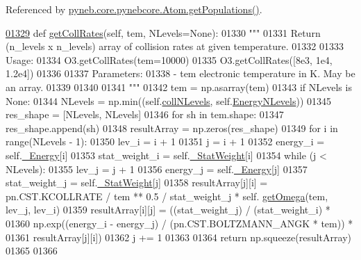 Referenced by \hyperlink{pynebcore_8py_source_l01496}{pyneb.\+core.\+pynebcore.\+Atom.\+get\+Populations()}.


\begin{DoxyCode}
\hypertarget{classpyneb_1_1core_1_1pynebcore_1_1_atom_l01329}{}\hyperlink{classpyneb_1_1core_1_1pynebcore_1_1_atom_a34711ea989baf7bde752a68255d32098}{01329}     \textcolor{keyword}{def }\hyperlink{classpyneb_1_1core_1_1pynebcore_1_1_atom_a34711ea989baf7bde752a68255d32098}{getCollRates}(self, tem, NLevels=None):
01330         \textcolor{stringliteral}{"""}
01331 \textcolor{stringliteral}{        Return (n\_levels x n\_levels) array of collision rates at given temperature. }
01332 \textcolor{stringliteral}{        }
01333 \textcolor{stringliteral}{        Usage:}
01334 \textcolor{stringliteral}{            O3.getCollRates(tem=10000)}
01335 \textcolor{stringliteral}{            O3.getCollRates([8e3, 1e4, 1.2e4])}
01336 \textcolor{stringliteral}{        }
01337 \textcolor{stringliteral}{        Parameters:}
01338 \textcolor{stringliteral}{            - tem     electronic temperature in K. May be an array.}
01339 \textcolor{stringliteral}{}
01340 \textcolor{stringliteral}{}
01341 \textcolor{stringliteral}{        """}
01342         tem = np.asarray(tem)
01343         \textcolor{keywordflow}{if} NLevels \textcolor{keywordflow}{is} \textcolor{keywordtype}{None}:
01344             NLevels = np.min((self.\hyperlink{classpyneb_1_1core_1_1pynebcore_1_1_atom_a8beaa0244d575054b3e2748a5e00d8db}{collNLevels}, self.\hyperlink{classpyneb_1_1core_1_1pynebcore_1_1_atom_a03277bf57e7056ec2199cc89f2a007aa}{EnergyNLevels}))
01345         res\_shape = [NLevels, NLevels]
01346         \textcolor{keywordflow}{for} sh \textcolor{keywordflow}{in} tem.shape:
01347             res\_shape.append(sh)
01348         resultArray = np.zeros(res\_shape)
01349         \textcolor{keywordflow}{for} i \textcolor{keywordflow}{in} range(NLevels - 1):
01350             lev\_i = i + 1
01351             j = i + 1
01352             energy\_i = self.\hyperlink{classpyneb_1_1core_1_1pynebcore_1_1_atom_a52e68715246d258bf0a14f4bd06e89e4}{\_Energy}[i]
01353             stat\_weight\_i = self.\hyperlink{classpyneb_1_1core_1_1pynebcore_1_1_atom_a1e76c66b89eb327aeb4cdb1d8bd46fb5}{\_StatWeight}[i]
01354             \textcolor{keywordflow}{while} (j < NLevels):
01355                 lev\_j = j + 1 
01356                 energy\_j = self.\hyperlink{classpyneb_1_1core_1_1pynebcore_1_1_atom_a52e68715246d258bf0a14f4bd06e89e4}{\_Energy}[j]
01357                 stat\_weight\_j = self.\hyperlink{classpyneb_1_1core_1_1pynebcore_1_1_atom_a1e76c66b89eb327aeb4cdb1d8bd46fb5}{\_StatWeight}[j]
01358                 resultArray[j][i] = pn.CST.KCOLLRATE / tem ** 0.5 / stat\_weight\_j * self.
      \hyperlink{classpyneb_1_1core_1_1pynebcore_1_1_atom_ae133eed382e284df01f2183da341534b}{getOmega}(tem, lev\_j, lev\_i)
01359                 resultArray[i][j] = ((stat\_weight\_j) / (stat\_weight\_i) * 
01360                                       np.exp((energy\_i - energy\_j) / (pn.CST.BOLTZMANN\_ANGK * tem)) * 
01361                                       resultArray[j][i])
01362                 j += 1
01363         
01364         \textcolor{keywordflow}{return} np.squeeze(resultArray)
01365 
01366     
\end{DoxyCode}
